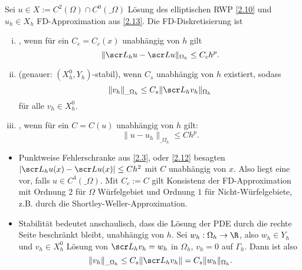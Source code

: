 \begin{df} \label{2.21}
	Sei $u \in X := C^2(\Omega) \cap C^0(\_\Omega)$ Lösung des elliptischen RWP \ref{2.10} und $u_h \in X_h$ FD-Approximation aus \ref{2.13}.
	Die FD-Diskretisierung ist
	\begin{enumerate}[i)]
		\item
			, wenn für ein $C_c = C_c(x)$ unabhängig von $h$ gilt
			\[
				\|\scr L_h u - \scr L u\|_{\Omega_h} \le C_c h^p.
			\]
		\item
			 (genauer: $(X_h^0, Y_h)$-stabil), wenn $C_s$ unabhängig von $h$ existiert, sodass
			\[
				\|v_h\|_{\_\Omega_h} \le C_s \|\scr L_h v_h\|_{\Omega_h}
			\]
			für alle $v_h \in X_h^0$.
		\item
			, wenn für ein $C = C(u)$ unabhängig von $h$ gilt:
			\[
				\|u - u_h\|_{\_\Omega_h} \le C h^p.
			\]
	\end{enumerate}
	\begin{note}
		\begin{itemize}
			\item
				Punktweise Fehlerschranke aus \ref{2.3}, oder \ref{2.12} besagten $|\scr L_h u(x) - \scr L u(x)| \le C h^2$ mit $C$ unabhängig von $x$.
				Also liegt eine  vor, falls $u \in C^4(\_\Omega)$.
				Mit $C_c := C$ gilt Konsistenz der FD-Approximation mit Ordnung 2 für $\Omega$ Würfelgebiet und Ordnung $1$ für Nicht-Würfelgebiete, z.B. durch die Shortley-Weller-Approximation.
		\end{itemize}
	\end{note}
	\begin{note}[Stabilität]
		\begin{itemize}
			\item
				Stabilität bedeutet anschaulisch, dass die Lösung der PDE durch die rechte Seite beschränkt bleibt, unabhängig von $h$.
				Sei $w_h: \Omega_h \to \R$, also $w_h \in Y_h$ und $v_h \in X_h^0$ Lösung von $\scr L_h v_h = w_h$ in $\Omega_h$, $v_h = 0$ auf $\Gamma_h$.
				Dann ist also
				\[
					\|v_h\|_{\_\Omega_h} \le C_s \|\scr L_h v_h\| = C_s \|w_h\|_{\Omega_h}.
				\]
		\end{itemize}
	\end{note}
\end{df}

